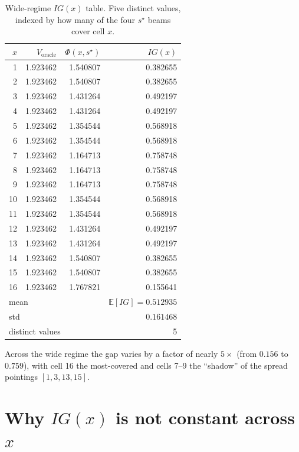\documentclass[11pt,a4paper]{article}
\newcommand{\E}{\mathbb{E}}
\begin{document}
\begin{table}[h!]
\centering
\begin{tabular}{@{}rrrr@{}}
\toprule
$x$ & $V_{\text{oracle}}$ & $\Phi(x, s^\star)$ & $IG(x)$ \\
\midrule
1     & 1.923462 & 1.540807 & 0.382655 \\
2     & 1.923462 & 1.540807 & 0.382655 \\
3     & 1.923462 & 1.431264 & 0.492197 \\
4     & 1.923462 & 1.431264 & 0.492197 \\
5     & 1.923462 & 1.354544 & 0.568918 \\
6     & 1.923462 & 1.354544 & 0.568918 \\
7     & 1.923462 & 1.164713 & 0.758748 \\
8     & 1.923462 & 1.164713 & 0.758748 \\
9     & 1.923462 & 1.164713 & 0.758748 \\
10    & 1.923462 & 1.354544 & 0.568918 \\
11    & 1.923462 & 1.354544 & 0.568918 \\
12    & 1.923462 & 1.431264 & 0.492197 \\
13    & 1.923462 & 1.431264 & 0.492197 \\
14    & 1.923462 & 1.540807 & 0.382655 \\
15    & 1.923462 & 1.540807 & 0.382655 \\
16    & 1.923462 & 1.767821 & 0.155641 \\
\midrule
\multicolumn{3}{l}{mean} & $\E[IG] = 0.512935$ \\
\multicolumn{3}{l}{std} & $0.161468$ \\
\multicolumn{3}{l}{distinct values} & 5 \\
\bottomrule
\end{tabular}
\caption{Wide-regime $IG(x)$ table.  Five distinct values, indexed by how many of the four $s^\star$ beams cover cell $x$.}
\label{tab:IG_wide}
\end{table}

Across the wide regime the gap varies by a factor of nearly $5\times$ (from $0.156$ to $0.759$), with cell 16 the most-covered and cells 7--9 the ``shadow'' of the spread pointings $[1, 3, 13, 15]$.

\section{Why $IG(x)$ is not constant across $x$}
\end{document}
